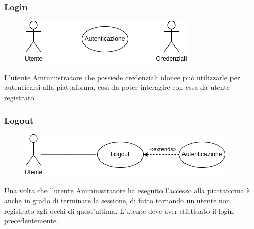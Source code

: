 \documentclass{article}
\begin{document}
\subsubsection{Login}\label{rf_5}
\begin{description}

	\begin{figure}[htp]
	\centering
	\includegraphics[]{rf5.png}
	\end{figure}

    \item L'utente Amministratore che possiede credenziali idonee può utilizzarle per autenticarsi alla piattaforma, così da poter interagire con essa da utente registrato.
\end{description}

\renewcommand\thesubsubsection{RF 6}
\subsubsection{Logout}\label{rf_6}
\begin{description}

	\begin{figure}[htp]
	\centering
	\includegraphics[]{rf6.png}
	\end{figure}

    \item Una volta che l'utente Amministratore ha eseguito l'accesso alla piattaforma è anche in grado di terminare la sessione, di fatto tornando un utente non registrato agli occhi di quest'ultima. L'utente deve aver effettuato il login precedentemente. 
\end{description}

\renewcommand\thesubsubsection{RF 7}
\end{document}
